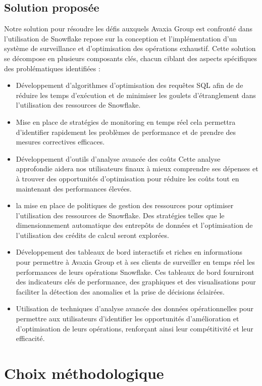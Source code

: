 \subsection{Solution proposée}
\par Notre solution pour résoudre les défis auxquels Avaxia Group est confronté dans l'utilisation de Snowflake repose sur la conception et l'implémentation d'un système de surveillance et d'optimisation des opérations exhaustif. Cette solution se décompose en plusieurs composants clés, chacun ciblant des aspects spécifiques des problématiques identifiées :
\begin{itemize}
    \item Développement d'algorithmes d'optimisation des requêtes SQL afin de de réduire les temps d'exécution et de minimiser les goulets d'étranglement dans l'utilisation des ressources de Snowflake.
    \item Mise en place de stratégies de monitoring en temps réel cela permettra d'identifier rapidement les problèmes de performance et de prendre des mesures correctives efficaces.
    \item Développement d'outils d'analyse avancée des coûts Cette analyse approfondie aidera nos utilisateurs finaux à mieux comprendre ses dépenses et à trouver des opportunités d'optimisation pour réduire les coûts tout en maintenant des performances élevées.
    \item la mise en place de politiques de gestion des ressources pour optimiser l'utilisation des ressources de Snowflake. Des stratégies telles que le dimensionnement automatique des entrepôts de données et l'optimisation de l'utilisation des crédits de calcul seront explorées.
    \item Développement des tableaux de bord interactifs et riches en informations pour permettre à Avaxia Group et à ses clients de surveiller en temps réel les performances de leurs opérations Snowflake. Ces tableaux de bord fourniront des indicateurs clés de performance, des graphiques et des visualisations pour faciliter la détection des anomalies et la prise de décisions éclairées.
    \item Utilisation de techniques d'analyse avancée des données opérationnelles pour permettre aux utilisateurs  d'identifier les opportunités d'amélioration et d'optimisation de leurs opérations, renforçant ainsi leur compétitivité et leur efficacité.
\end{itemize}


\section{Choix méthodologique}

